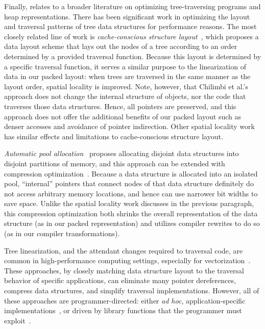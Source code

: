 Finally, \ourcalc relates to a broader literature on optimizing
tree-traversing programs and heap representations.
%
There has been significant work in optimizing the layout and
traversal patterns of tree data structures for performance reasons.
%
The most closely related line of work is \emph{cache-conscious structure
  layout}~\cite{chilimbi1999}, which proposes a data layout scheme that lays out
the nodes of a tree according to an order determined by a provided traversal
function. Because this layout is determined by a specific traversal function,
it serves a similar purpose to the linearization of data in our packed layout:
when trees are traversed in the same manner as the layout order, spatial
locality is improved. Note, however, that Chilimbi et al.'s approach does not
change the internal structure of objects, nor the code that traverses those
data structures. Hence, all pointers are preserved, and this approach does not
offer the additional benefits of our packed layout such as denser accesses and
avoidance of pointer indirection. Other spatial locality
work~\cite{Truong1998,Lattner2005,Chilimbi1999a} has similar effects and
limitations to cache-conscious structure layout.

\emph{Automatic pool allocation}~\cite{Lattner2005} proposes
allocating disjoint data structures into disjoint partitions of
memory, and this approach can be extended with compression
optimization~\cite{Lattner2005mspc}. Because a data structure is
allocated into an isolated pool, ``internal'' pointers that connect
nodes of that data structure definitely do not access arbitrary memory
locations, and hence can use narrower bit widths to save space. Unlike
the spatial locality work discusses in the previous paragraph, this
compression optimization both shrinks the overall representation of
the data structure (as in our packed representation) and utilizes
compiler rewrites to do so (as in our compiler transformations).

Tree linearization, and the attendant changes required to traversal code, are
common in high-performance computing settings, especially for
vectorization~\cite{makino90,goldfarb13sc,Meyerovich2011,ren13cgo,ren14taco}.
These approaches, by closely matching data structure layout to the traversal
behavior of specific applications, can eliminate many pointer dereferences,
compress data structures, and simplify traversal implementations. However, all
of these approaches are programmer-directed: either \emph{ad hoc},
application-specific
implementations~\cite{makino90,goldfarb13sc,Meyerovich2011}, or driven by
library functions that the programmer must exploit~\cite{ren13cgo,ren14taco}.


